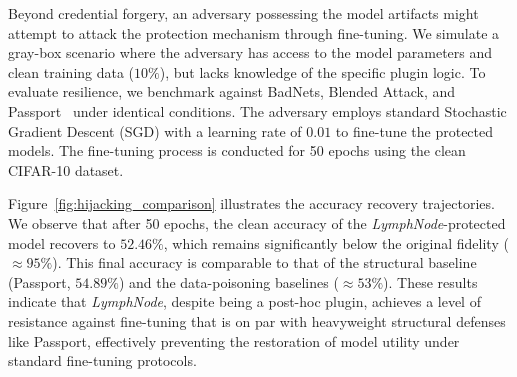 \documentclass[conference]{IEEEtran}
\begin{document}
Beyond credential forgery, an adversary possessing the model artifacts might attempt to attack the protection mechanism through fine-tuning. We simulate a gray-box scenario where the adversary has access to the model parameters and clean training data ($10\%$), but lacks knowledge of the specific plugin logic. To evaluate resilience, we benchmark against BadNets, Blended Attack, and Passport~\cite{fan2022deepipr} under identical conditions. The adversary employs standard Stochastic Gradient Descent (SGD) with a learning rate of $0.01$ to fine-tune the protected models. The fine-tuning process is conducted for 50 epochs using the clean CIFAR-10 dataset.

Figure~\ref{fig:hijacking_comparison} illustrates the accuracy recovery trajectories. We observe that after 50 epochs, the clean accuracy of the \textit{LymphNode}-protected model recovers to $52.46\%$, which remains significantly below the original fidelity ($\approx 95\%$). This final accuracy is comparable to that of the structural baseline (Passport, $54.89\%$) and the data-poisoning baselines ($\approx 53\%$). These results indicate that \textit{LymphNode}, despite being a post-hoc plugin, achieves a level of resistance against fine-tuning that is on par with heavyweight structural defenses like Passport, effectively preventing the restoration of model utility under standard fine-tuning protocols.
\end{document}

